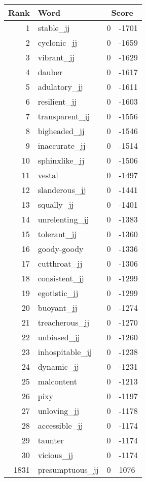 \begin{longtable}[!htbp]{| rlr@{.}l |}
    \hline
    \textbf{Rank} & \textbf{Word} & \multicolumn{2}{c|}{\textbf{Score}} \\
    \hline
    \endhead
    1 & stable\_jj & 0 & -1701 \\
    2 & cyclonic\_jj & 0 & -1659 \\
    3 & vibrant\_jj & 0 & -1629 \\
    4 & dauber & 0 & -1617 \\
    5 & adulatory\_jj & 0 & -1611 \\
    6 & resilient\_jj & 0 & -1603 \\
    7 & transparent\_jj & 0 & -1556 \\
    8 & bigheaded\_jj & 0 & -1546 \\
    9 & inaccurate\_jj & 0 & -1514 \\
    10 & sphinxlike\_jj & 0 & -1506 \\
    11 & vestal & 0 & -1497 \\
    12 & slanderous\_jj & 0 & -1441 \\
    13 & squally\_jj & 0 & -1401 \\
    14 & unrelenting\_jj & 0 & -1383 \\
    15 & tolerant\_jj & 0 & -1360 \\
    16 & goody-goody & 0 & -1336 \\
    17 & cutthroat\_jj & 0 & -1306 \\
    18 & consistent\_jj & 0 & -1299 \\
    19 & egotistic\_jj & 0 & -1299 \\
    20 & buoyant\_jj & 0 & -1274 \\
    21 & treacherous\_jj & 0 & -1270 \\
    22 & unbiased\_jj & 0 & -1260 \\
    23 & inhospitable\_jj & 0 & -1238 \\
    24 & dynamic\_jj & 0 & -1231 \\
    25 & malcontent & 0 & -1213 \\
    26 & pixy & 0 & -1197 \\
    27 & unloving\_jj & 0 & -1178 \\
    28 & accessible\_jj & 0 & -1174 \\
    29 & taunter & 0 & -1174 \\
    30 & vicious\_jj & 0 & -1174 \\
    1831 & presumptuous\_jj & 0 & 1076 \\

\end{longtable}
